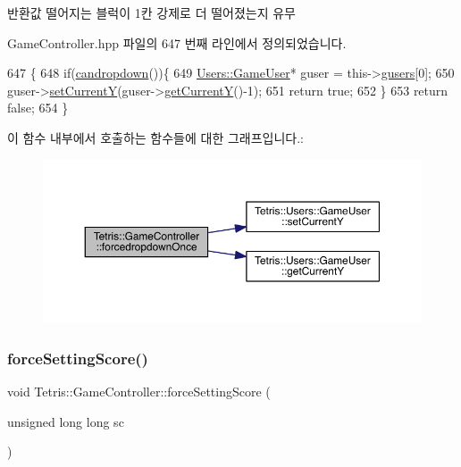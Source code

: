\begin{DoxyReturn}{반환값}
떨어지는 블럭이 1칸 강제로 더 떨어졌는지 유무 
\end{DoxyReturn}


Game\+Controller.\+hpp 파일의 647 번째 라인에서 정의되었습니다.


\begin{DoxyCode}
647                                 \{
648             \textcolor{keywordflow}{if}(\hyperlink{class_tetris_1_1_game_controller_ac4993d5ad8640ac617fec341fdb301ee}{candropdown}())\{
649                  \hyperlink{class_tetris_1_1_users_1_1_game_user}{Users::GameUser}* guser = this->\hyperlink{class_tetris_1_1_game_controller_a1a31d3a933daad6d95e20458eea2900e}{gusers}[0];
650                 guser->\hyperlink{class_tetris_1_1_users_1_1_game_user_aeedbe521004c22018b73a509e99f7d81}{setCurrentY}(guser->\hyperlink{class_tetris_1_1_users_1_1_game_user_af5bd7ff0b575af1b42b093488cff97e2}{getCurrentY}()-1);
651                 \textcolor{keywordflow}{return} \textcolor{keyword}{true};
652             \}
653             \textcolor{keywordflow}{return} \textcolor{keyword}{false};
654         \}
\end{DoxyCode}
이 함수 내부에서 호출하는 함수들에 대한 그래프입니다.\+:
\nopagebreak
\begin{figure}[H]
\begin{center}
\leavevmode
\includegraphics[width=350pt]{db/dd2/class_tetris_1_1_game_controller_a035e352a85db58a05322156af606f0fa_cgraph}
\end{center}
\end{figure}
\mbox{\label{class_tetris_1_1_game_controller_ab0fafbfd1d87713f4f9233ccc547ffb8}} 
\subsubsection{\texorpdfstring{force\+Setting\+Score()}{forceSettingScore()}}
{\footnotesize\ttfamily void Tetris\+::\+Game\+Controller\+::force\+Setting\+Score (\begin{DoxyParamCaption}\item[{unsigned long long}]{sc }\end{DoxyParamCaption})\hspace{0.3cm}{\ttfamily [inline]}}



